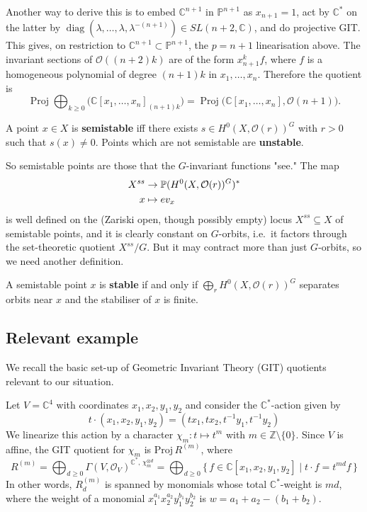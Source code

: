 \documentclass[12pt]{article}
\begin{document}
\begin{example}
Another way to derive this is to embed $\mathbb{C}^{n+1}$ in $\mathbb{P}^{n+1}$ as 
$x_{n+1}=1$, act by $\mathbb{C}^*$ on the latter by 
$\operatorname{diag}(\lambda,\dots,\lambda,\lambda^{-(n+1)}) \in SL(n+2,\mathbb{C})$, 
and do projective GIT. This gives, on restriction to $\mathbb{C}^{n+1} \subset \mathbb{P}^{n+1}$, 
the $p=n+1$ linearisation above. The invariant sections of $\mathcal{O}((n+2)k)$ are of the form 
$x_{n+1}^k f$, where $f$ is a homogeneous polynomial of degree $(n+1)k$ in $x_1,\dots,x_n$. 
Therefore the quotient is
\[
\operatorname{Proj} \bigoplus_{k\ge 0} 
\big(\mathbb{C}[x_1,\dots,x_n]_{(n+1)k}\big) = \operatorname{Proj} \big(\mathbb{C}[x_1,\dots,x_n],\mathcal{O}(n+1)\big).
\]
\end{example}


\begin{definition}
A point $x \in X$ is \textbf{semistable} iff there exists 
$s \in H^0(X,\mathcal{O}(r))^G$ with $r>0$ such that $s(x) \neq 0$. Points which are not
semistable are \textbf{unstable}.
\end{definition}
So semistable points are those that the $G$-invariant functions "see." The map \begin{align*}
    X^{ss} &\to \P(H^0(X,\mathcal{O}(r))^G)^* \\
    x &\mapsto ev_x
\end{align*} is well defined on the (Zariski open, though possibly empty) locus $X^{ss} \subseteq X$ of semistable points, and it is clearly constant on $G$-orbits, 
i.e.~it factors through the set-theoretic quotient $X^{ss}/G$. But it may contract more 
than just $G$-orbits, so we need another definition.

\begin{definition}
A semistable point $x$ is \textbf{stable} if and only if 
$\bigoplus_r H^0(X,\mathcal{O}(r))^G$ separates orbits near $x$ and the stabiliser of $x$ is finite.
\end{definition}




\subsection{Relevant example}
We recall the basic set-up of Geometric Invariant Theory (GIT) quotients relevant to our situation.

Let $V = \mathbb{C}^4$ with coordinates $x_1,x_2,y_1,y_2$ and consider the $\mathbb{C}^*$-action given by 
\[
t\cdot(x_1,x_2,y_1,y_2)=(t x_1, t x_2, t^{-1}y_1, t^{-1}y_2)
\]
We linearize this action by a character $\chi_m:t\mapsto t^m$ with $m\in\mathbb{Z}\setminus\{0\}$. Since $V$ is affine, the GIT quotient for $\chi_m$ is $\mathrm{Proj}\,R^{(m)}$, where
\[
R^{(m)}=\bigoplus_{d\ge 0} \Gamma(V,\mathcal{O}_V)^{\mathbb{C}^*,\,\chi_m^{\otimes d}}=\bigoplus_{d\ge 0}\{\,f\in\mathbb{C}[x_1,x_2,y_1,y_2]\mid t\cdot f = t^{md} f\,\}
\]
In other words, $R^{(m)}_d$ is spanned by monomials whose total $\mathbb{C}^*$-weight is $md$, where the weight of a monomial $x_1^{a_1}x_2^{a_2}y_1^{b_1}y_2^{b_2}$ is $w=a_1+a_2-(b_1+b_2)$.
\end{document}
